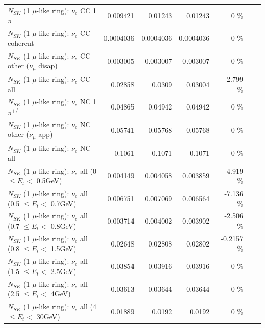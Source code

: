\begin{table}
\begin{tabular}{| l | r | r | r  r | r  r |}
                                 $N_{SK}$ (1 $\mu$-like ring): $\nu_e$ CC 1$\pi$ &        0.009421 &        0.01243 &        0.01243 &       0 \%  & & \\
                               $N_{SK}$ (1 $\mu$-like ring): $\nu_e$ CC coherent &       0.0004036 &      0.0004036 &      0.0004036 &       0 \%  & & \\
                $N_{SK}$ (1 $\mu$-like ring): $\nu_e$ CC other ($\nu_\mu$ disap) &        0.003005 &       0.003007 &       0.003007 &       0 \%  & & \\
                                  $N_{SK}$ (1 $\mu$-like ring): $\nu_{e}$ CC all &         0.02858 &         0.0309 &        0.03004 &  -2.799 \%  & & \\
\hline
                           $N_{SK}$ (1 $\mu$-like ring): $\nu_e$ NC 1$\pi^{+/-}$ &         0.04865 &        0.04942 &        0.04942 &       0 \%  & & \\
                  $N_{SK}$ (1 $\mu$-like ring): $\nu_e$ NC other ($\nu_\mu$ app) &         0.05741 &        0.05768 &        0.05768 &       0 \%  & & \\
                                  $N_{SK}$ (1 $\mu$-like ring): $\nu_{e}$ NC all &          0.1061 &         0.1071 &         0.1071 &       0 \%  & & \\
\hline
           $N_{SK}$ (1 $\mu$-like ring): $\nu_{e}$ all (0 $\leq E_{t} <$ 0.5GeV) &        0.004149 &       0.004058 &       0.003859 &  -4.919 \%  & & \\
         $N_{SK}$ (1 $\mu$-like ring): $\nu_{e}$ all (0.5 $\leq E_{t} <$ 0.7GeV) &        0.006751 &       0.007069 &       0.006564 &  -7.136 \%  & & \\
         $N_{SK}$ (1 $\mu$-like ring): $\nu_{e}$ all (0.7 $\leq E_{t} <$ 0.8GeV) &        0.003714 &       0.004002 &       0.003902 &  -2.506 \%  & & \\
         $N_{SK}$ (1 $\mu$-like ring): $\nu_{e}$ all (0.8 $\leq E_{t} <$ 1.5GeV) &         0.02648 &        0.02808 &        0.02802 & -0.2157 \%  & & \\
         $N_{SK}$ (1 $\mu$-like ring): $\nu_{e}$ all (1.5 $\leq E_{t} <$ 2.5GeV) &         0.03854 &        0.03916 &        0.03916 &       0 \%  & & \\
           $N_{SK}$ (1 $\mu$-like ring): $\nu_{e}$ all (2.5 $\leq E_{t} <$ 4GeV) &         0.03613 &        0.03644 &        0.03644 &       0 \%  & & \\
            $N_{SK}$ (1 $\mu$-like ring): $\nu_{e}$ all (4 $\leq E_{t} <$ 30GeV) &         0.01889 &         0.0192 &         0.0192 &       0 \%  & & \\

\end{tabular}
\end{table}

